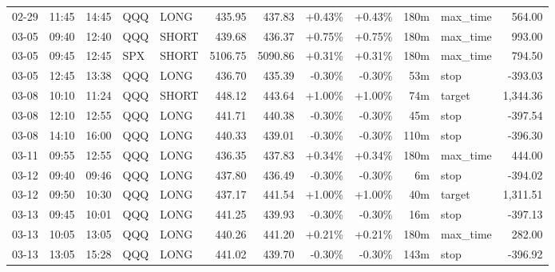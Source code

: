\documentclass[11pt,a4paper,twoside]{article}
\begin{document}
\begin{center}
\begin{longtable}{>{\color{txtmain}}l l l l l r r r r r >{\color{txtmain}}l r}
02-29 & 11:45 & 14:45 & QQQ & LONG & 435.95 & 437.83 & \textcolor{wingreen}{+0.43\%} & \textcolor{wingreen}{+0.43\%} & 180m & max\_time & \textcolor{wingreen}{564.00} \\
03-05 & 09:40 & 12:40 & QQQ & SHORT & 439.68 & 436.37 & \textcolor{wingreen}{+0.75\%} & \textcolor{wingreen}{+0.75\%} & 180m & max\_time & \textcolor{wingreen}{993.00} \\
03-05 & 09:45 & 12:45 & SPX & SHORT & 5106.75 & 5090.86 & \textcolor{wingreen}{+0.31\%} & \textcolor{wingreen}{+0.31\%} & 180m & max\_time & \textcolor{wingreen}{794.50} \\
03-05 & 12:45 & 13:38 & QQQ & LONG & 436.70 & 435.39 & \textcolor{lossred}{-0.30\%} & \textcolor{lossred}{-0.30\%} & 53m & stop & \textcolor{lossred}{-393.03} \\
03-08 & 10:10 & 11:24 & QQQ & SHORT & 448.12 & 443.64 & \textcolor{wingreen}{+1.00\%} & \textcolor{wingreen}{+1.00\%} & 74m & target & \textcolor{wingreen}{1,344.36} \\
03-08 & 12:10 & 12:55 & QQQ & LONG & 441.71 & 440.38 & \textcolor{lossred}{-0.30\%} & \textcolor{lossred}{-0.30\%} & 45m & stop & \textcolor{lossred}{-397.54} \\
03-08 & 14:10 & 16:00 & QQQ & LONG & 440.33 & 439.01 & \textcolor{lossred}{-0.30\%} & \textcolor{lossred}{-0.30\%} & 110m & stop & \textcolor{lossred}{-396.30} \\
03-11 & 09:55 & 12:55 & QQQ & LONG & 436.35 & 437.83 & \textcolor{wingreen}{+0.34\%} & \textcolor{wingreen}{+0.34\%} & 180m & max\_time & \textcolor{wingreen}{444.00} \\
03-12 & 09:40 & 09:46 & QQQ & LONG & 437.80 & 436.49 & \textcolor{lossred}{-0.30\%} & \textcolor{lossred}{-0.30\%} & 6m & stop & \textcolor{lossred}{-394.02} \\
03-12 & 09:50 & 10:30 & QQQ & LONG & 437.17 & 441.54 & \textcolor{wingreen}{+1.00\%} & \textcolor{wingreen}{+1.00\%} & 40m & target & \textcolor{wingreen}{1,311.51} \\
03-13 & 09:45 & 10:01 & QQQ & LONG & 441.25 & 439.93 & \textcolor{lossred}{-0.30\%} & \textcolor{lossred}{-0.30\%} & 16m & stop & \textcolor{lossred}{-397.13} \\
03-13 & 10:05 & 13:05 & QQQ & LONG & 440.26 & 441.20 & \textcolor{wingreen}{+0.21\%} & \textcolor{wingreen}{+0.21\%} & 180m & max\_time & \textcolor{wingreen}{282.00} \\
03-13 & 13:05 & 15:28 & QQQ & LONG & 441.02 & 439.70 & \textcolor{lossred}{-0.30\%} & \textcolor{lossred}{-0.30\%} & 143m & stop & \textcolor{lossred}{-396.92} \\

\end{longtable}
\end{center}
\end{document}
